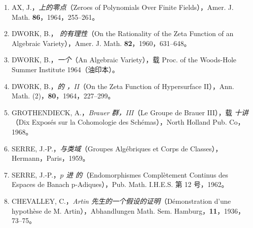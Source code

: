 \begin{enumerate}
\item[{[1]}] AX, J.，\emph{上的零点}（Zeroes of Polynomials Over Finite Fields），Amer. J. Math. \textbf{86}，1964，255--261。
\item[{[2]}] DWORK, B.，\emph{ 的有理性}（On the Rationality of the Zeta Function of an Algebraic Variety），Amer. J. Math. \textbf{82}，1960，631--648。
\item[{[3]}] DWORK, B.，\emph{一个}（An Algebraic Variety），载 Proc. of the Woods-Hole Summer Institute 1964（油印本）。
\item[{[4]}] DWORK, B.，\emph{的 ，II}（On the Zeta Function of Hypersurface II），Ann. Math. (2)，\textbf{80}，1964，227--299。
\item[{[5]}] GROTHENDIECK, A.，\emph{Brauer 群，III}（Le Groupe de Brauer III），载 \emph{十讲}（Dix Exposés sur la Cohomologie des Schémas），North Holland Pub. Co，1968。
\item[{[6]}] SERRE, J.-P.，\emph{与类域}（Groupes Algébriques et Corps de Classes），Hermann，Paris，1959。
\item[{[7]}] SERRE, J.-P.，\emph{$p$ 进 的}（Endomorphismes Complètement Continus des Espaces de Banach p-Adiques），Pub. Math. I.H.E.S. 第 12 号，1962。
\item[{[8]}] CHEVALLEY, C.，\emph{Artin 先生的一个假设的证明}（Démonstration d'une hypothèse de M. Artin），Abhandlungen Math. Sem. Hamburg，\textbf{11}，1936，73--75。
\end{enumerate}
